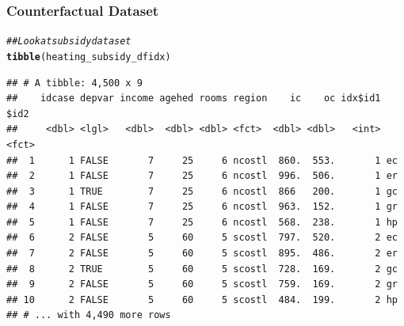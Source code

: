 \documentclass{beamer}\usepackage[]{graphicx}\usepackage[]{xcolor}
\makeatletter
\newcommand{\hlnum}[1]{\textcolor[rgb]{0.686,0.059,0.569}{#1}}%
\newcommand{\hlstr}[1]{\textcolor[rgb]{0.192,0.494,0.8}{#1}}%
\newcommand{\hlcom}[1]{\textcolor[rgb]{0.678,0.584,0.686}{\textit{#1}}}%
\newcommand{\hlopt}[1]{\textcolor[rgb]{0,0,0}{#1}}%
\newcommand{\hlstd}[1]{\textcolor[rgb]{0.345,0.345,0.345}{#1}}%
\newcommand{\hlkwb}[1]{\textcolor[rgb]{0.69,0.353,0.396}{#1}}%
\newcommand{\hlkwc}[1]{\textcolor[rgb]{0.333,0.667,0.333}{#1}}%
\newcommand{\hlkwd}[1]{\textcolor[rgb]{0.737,0.353,0.396}{\textbf{#1}}}%
\newenvironment{kframe}{%
 \def\at@end@of@kframe{}%
 \ifinner\ifhmode%
  \def\at@end@of@kframe{\end{minipage}}%
  \begin{minipage}{\columnwidth}%
 \fi\fi%
 \def\FrameCommand##1{\hskip\@totalleftmargin \hskip-\fboxsep
 \colorbox{shadecolor}{##1}\hskip-\fboxsep
     \hskip-\linewidth \hskip-\@totalleftmargin \hskip\columnwidth}%
 \MakeFramed {\advance\hsize-\width
   \@totalleftmargin\z@ \linewidth\hsize
   \@setminipage}}%
 {\par\unskip\endMakeFramed%
 \at@end@of@kframe}
\newenvironment{knitrout}{}{} %
\makeatother
\begin{document}

\begin{frame}[fragile]\frametitle{Counterfactual Dataset}
\begin{knitrout}\footnotesize
{}\color{fgcolor}\begin{kframe}
\begin{alltt}
\hlcom{## Look at subsidy dataset}
\hlkwd{tibble}\hlstd{(heating_subsidy_dfidx)}
\end{alltt}
\begin{verbatim}
## # A tibble: 4,500 x 9
##    idcase depvar income agehed rooms region    ic    oc idx$id1 $id2 
##     <dbl> <lgl>   <dbl>  <dbl> <dbl> <fct>  <dbl> <dbl>   <int> <fct>
##  1      1 FALSE       7     25     6 ncostl  860.  553.       1 ec   
##  2      1 FALSE       7     25     6 ncostl  996.  506.       1 er   
##  3      1 TRUE        7     25     6 ncostl  866   200.       1 gc   
##  4      1 FALSE       7     25     6 ncostl  963.  152.       1 gr   
##  5      1 FALSE       7     25     6 ncostl  568.  238.       1 hp   
##  6      2 FALSE       5     60     5 scostl  797.  520.       2 ec   
##  7      2 FALSE       5     60     5 scostl  895.  486.       2 er   
##  8      2 TRUE        5     60     5 scostl  728.  169.       2 gc   
##  9      2 FALSE       5     60     5 scostl  759.  169.       2 gr   
## 10      2 FALSE       5     60     5 scostl  484.  199.       2 hp   
## # ... with 4,490 more rows
\end{verbatim}
\end{kframe}
\end{knitrout}
\end{frame}
\end{document}
